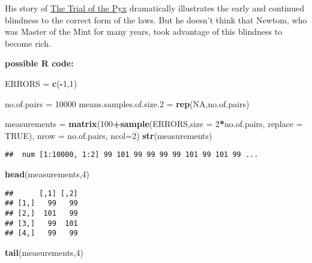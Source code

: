 \documentclass[]{book}
\newenvironment{Shaded}{\begin{snugshade}}{\end{snugshade}}
\newcommand{\DataTypeTok}[1]{\textcolor[rgb]{0.13,0.29,0.53}{#1}}
\newcommand{\DecValTok}[1]{\textcolor[rgb]{0.00,0.00,0.81}{#1}}
\newcommand{\FloatTok}[1]{\textcolor[rgb]{0.00,0.00,0.81}{#1}}
\newcommand{\KeywordTok}[1]{\textcolor[rgb]{0.13,0.29,0.53}{\textbf{#1}}}
\newcommand{\NormalTok}[1]{#1}
\newcommand{\OperatorTok}[1]{\textcolor[rgb]{0.81,0.36,0.00}{\textbf{#1}}}
\newcommand{\OtherTok}[1]{\textcolor[rgb]{0.56,0.35,0.01}{#1}}
\newcommand{\StringTok}[1]{\textcolor[rgb]{0.31,0.60,0.02}{#1}}
\begin{document}
His story of \href{http://www.biostat.mcgill.ca/hanley/c323/pyx.pdf}{The Trial of the Pyx} dramatically illustrates the early and continued blindness to the correct form of the laws. But he doesn't think that Newtom, who was Master of the Mint for many years, took advantage of this blindness to become rich.

\textbf{possible R code:}

\begin{Shaded}
\begin{Highlighting}[]
\NormalTok{ERRORS =}\StringTok{ }\KeywordTok{c}\NormalTok{(}\OperatorTok{-}\DecValTok{1}\NormalTok{,}\DecValTok{1}\NormalTok{)}

\NormalTok{no.of.pairs =}\StringTok{ }\DecValTok{10000} 
\NormalTok{means.samples.of.size}\FloatTok{.2}\NormalTok{ =}\StringTok{ }\KeywordTok{rep}\NormalTok{(}\OtherTok{NA}\NormalTok{,no.of.pairs)}

\NormalTok{measurements =}\StringTok{ }\KeywordTok{matrix}\NormalTok{(}\DecValTok{100}\OperatorTok{+}\KeywordTok{sample}\NormalTok{(ERRORS,}\DataTypeTok{size =} \DecValTok{2}\OperatorTok{*}\NormalTok{no.of.pairs, }\DataTypeTok{replace =} \OtherTok{TRUE}\NormalTok{),}
                      \DataTypeTok{nrow =}\NormalTok{ no.of.pairs, }\DataTypeTok{ncol=}\DecValTok{2}\NormalTok{)}
\KeywordTok{str}\NormalTok{(measurements)}
\end{Highlighting}
\end{Shaded}

\begin{verbatim}
##  num [1:10000, 1:2] 99 101 99 99 99 99 101 99 101 99 ...
\end{verbatim}

\begin{Shaded}
\begin{Highlighting}[]
\KeywordTok{head}\NormalTok{(measurements,}\DecValTok{4}\NormalTok{)}
\end{Highlighting}
\end{Shaded}

\begin{verbatim}
##      [,1] [,2]
## [1,]   99   99
## [2,]  101   99
## [3,]   99  101
## [4,]   99   99
\end{verbatim}

\begin{Shaded}
\begin{Highlighting}[]
\KeywordTok{tail}\NormalTok{(measurements,}\DecValTok{4}\NormalTok{)}
\end{Highlighting}
\end{Shaded}
\end{document}
